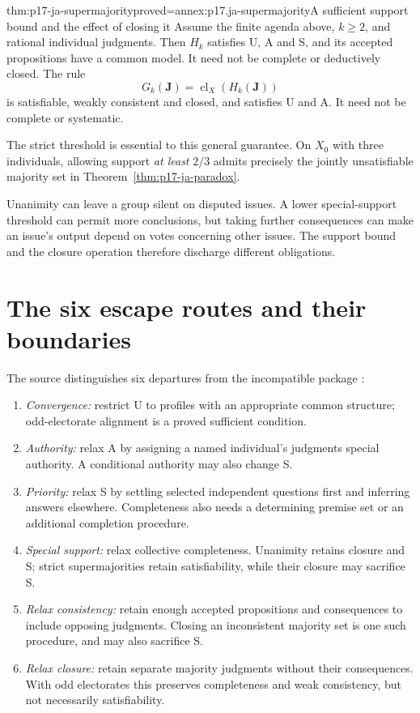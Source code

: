 \begin{hbtheorem}{thm:p17-ja-supermajority}{proved=annex:p17.ja-supermajority}{A sufficient support bound and the effect of closing it}
Assume the finite agenda above, \(k\geq2\), and rational individual judgments.
Then \(H_k\) satisfies U, A and S, and its accepted propositions have a common
model. It need not be complete or deductively closed. The rule
\[
 G_k(\mathbf J)=\operatorname{cl}_X(H_k(\mathbf J))
\]
is satisfiable, weakly consistent and closed, and satisfies U and A. It need not
be complete or systematic.

The strict threshold is essential to this general guarantee. On \(X_0\) with
three individuals, allowing support \emph{at least} \(2/3\) admits precisely
the jointly unsatisfiable majority set in Theorem~\ref{thm:p17-ja-paradox}.
\end{hbtheorem}

Unanimity can leave a group silent on disputed issues. A lower special-support
threshold can permit more conclusions, but taking further consequences can make
an issue's output depend on votes concerning other issues. The support bound
and the closure operation therefore discharge different obligations.

\section{The six escape routes and their boundaries}
\label{sec:p17-ja-escapes}

The source distinguishes six departures from the incompatible package
\cite[pp.~16--25]{ListPettit2001JudgmentPreprint}:
\begin{enumerate}
\item \emph{Convergence:} restrict U to profiles with an appropriate common
      structure; odd-electorate alignment is a proved sufficient condition.
\item \emph{Authority:} relax A by assigning a named individual's judgments
      special authority. A conditional authority may also change S.
\item \emph{Priority:} relax S by settling selected independent questions first
      and inferring answers elsewhere. Completeness also needs a determining
      premise set or an additional completion procedure.
\item \emph{Special support:} relax collective completeness. Unanimity retains
      closure and S; strict supermajorities retain satisfiability, while their
      closure may sacrifice S.
\item \emph{Relax consistency:} retain enough accepted propositions and
      consequences to include opposing judgments. Closing an inconsistent
      majority set is one such procedure, and may also sacrifice S.
\item \emph{Relax closure:} retain separate majority judgments without their
      consequences. With odd electorates this preserves completeness and weak
      consistency, but not necessarily satisfiability.
\end{enumerate}

